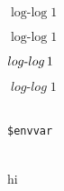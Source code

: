 \documentclass[11pt]{article}
\begin{document}

% 
% 

$\operatorname{log-log} 1$

$\mathit{\operatorname{log-log}} 1$

$\operatorname{\mathnormal{log-log}} 1$

$\operatorname{\mathit{log-log}} 1$

\ \\

\texttt{\$envvar}

\ \\

hi
\end{document}
